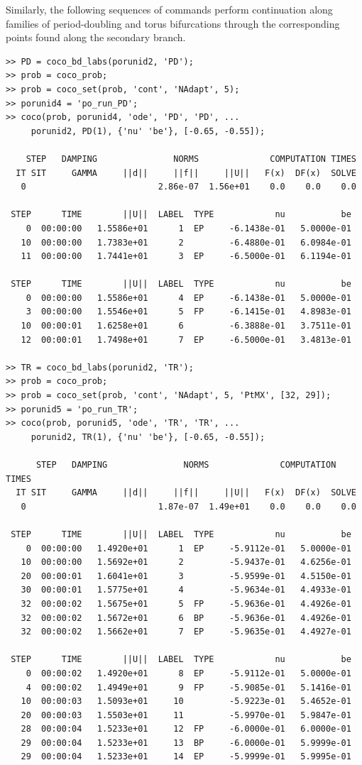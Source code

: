 Similarly, the following sequences of commands perform continuation along families of period-doubling and torus bifurcations through the corresponding points found along the secondary branch.
\begin{lstlisting}[language=coco-highlight,frame=lines]
>> PD = coco_bd_labs(porunid2, 'PD');
>> prob = coco_prob;
>> prob = coco_set(prob, 'cont', 'NAdapt', 5);
>> porunid4 = 'po_run_PD';
>> coco(prob, porunid4, 'ode', 'PD', 'PD', ...
     porunid2, PD(1), {'nu' 'be'}, [-0.65, -0.55]);

    STEP   DAMPING               NORMS              COMPUTATION TIMES
  IT SIT     GAMMA     ||d||     ||f||     ||U||   F(x)  DF(x)  SOLVE
   0                          2.86e-07  1.56e+01    0.0    0.0    0.0

 STEP      TIME        ||U||  LABEL  TYPE            nu           be
    0  00:00:00   1.5586e+01      1  EP     -6.1438e-01   5.0000e-01
   10  00:00:00   1.7383e+01      2         -6.4880e-01   6.0984e-01
   11  00:00:00   1.7441e+01      3  EP     -6.5000e-01   6.1194e-01

 STEP      TIME        ||U||  LABEL  TYPE            nu           be
    0  00:00:00   1.5586e+01      4  EP     -6.1438e-01   5.0000e-01
    3  00:00:00   1.5546e+01      5  FP     -6.1415e-01   4.8983e-01
   10  00:00:01   1.6258e+01      6         -6.3888e-01   3.7511e-01
   12  00:00:01   1.7498e+01      7  EP     -6.5000e-01   3.4813e-01
   
>> TR = coco_bd_labs(porunid2, 'TR');
>> prob = coco_prob;
>> prob = coco_set(prob, 'cont', 'NAdapt', 5, 'PtMX', [32, 29]);
>> porunid5 = 'po_run_TR';
>> coco(prob, porunid5, 'ode', 'TR', 'TR', ...
     porunid2, TR(1), {'nu' 'be'}, [-0.65, -0.55]);
  
      STEP   DAMPING               NORMS              COMPUTATION TIMES
  IT SIT     GAMMA     ||d||     ||f||     ||U||   F(x)  DF(x)  SOLVE
   0                          1.87e-07  1.49e+01    0.0    0.0    0.0

 STEP      TIME        ||U||  LABEL  TYPE            nu           be
    0  00:00:00   1.4920e+01      1  EP     -5.9112e-01   5.0000e-01
   10  00:00:00   1.5692e+01      2         -5.9437e-01   4.6256e-01
   20  00:00:01   1.6041e+01      3         -5.9599e-01   4.5150e-01
   30  00:00:01   1.5775e+01      4         -5.9634e-01   4.4933e-01
   32  00:00:02   1.5675e+01      5  FP     -5.9636e-01   4.4926e-01
   32  00:00:02   1.5672e+01      6  BP     -5.9636e-01   4.4926e-01
   32  00:00:02   1.5662e+01      7  EP     -5.9635e-01   4.4927e-01

 STEP      TIME        ||U||  LABEL  TYPE            nu           be
    0  00:00:02   1.4920e+01      8  EP     -5.9112e-01   5.0000e-01
    4  00:00:02   1.4949e+01      9  FP     -5.9085e-01   5.1416e-01
   10  00:00:03   1.5093e+01     10         -5.9223e-01   5.4652e-01
   20  00:00:03   1.5503e+01     11         -5.9970e-01   5.9847e-01
   28  00:00:04   1.5233e+01     12  FP     -6.0000e-01   6.0000e-01
   29  00:00:04   1.5233e+01     13  BP     -6.0000e-01   5.9999e-01
   29  00:00:04   1.5233e+01     14  EP     -5.9999e-01   5.9995e-01
\end{lstlisting}

